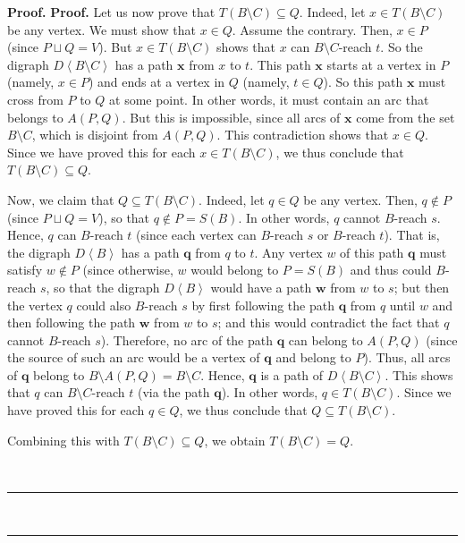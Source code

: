\documentclass[numbers=enddot,12pt,final,onecolumn,notitlepage]{scrartcl}%
\theoremstyle{definition}
\newenvironment{proof}[1][Proof]{\noindent\textbf{#1.} }{\ \rule{0.5em}{0.5em}}
\theoremstyle{plainsl}
\begin{document}
\begin{proof}
\begin{proof}
Let us now prove that $T\left(  B\setminus C\right)  \subseteq Q$. Indeed, let
$x\in T\left(  B\setminus C\right)  $ be any vertex. We must show that $x\in
Q$. Assume the contrary. Then, $x\in P$ (since $P\sqcup Q=V$). But $x\in
T\left(  B\setminus C\right)  $ shows that $x$ can $B\setminus C$-reach $t$.
So the digraph $D\left\langle B\setminus C\right\rangle $ has a path
$\mathbf{x}$ from $x$ to $t$. This path $\mathbf{x}$ starts at a vertex in $P$
(namely, $x\in P$) and ends at a vertex in $Q$ (namely, $t\in Q$). So this
path $\mathbf{x}$ must cross from $P$ to $Q$ at some point. In other words, it
must contain an arc that belongs to $A\left(  P,Q\right)  $. But this is
impossible, since all arcs of $\mathbf{x}$ come from the set $B\setminus C$,
which is disjoint from $A\left(  P,Q\right)  $. This contradiction shows that
$x\in Q$. Since we have proved this for each $x\in T\left(  B\setminus
C\right)  $, we thus conclude that $T\left(  B\setminus C\right)  \subseteq Q$.

Now, we claim that $Q\subseteq T\left(  B\setminus C\right)  $. Indeed, let
$q\in Q$ be any vertex. Then, $q\notin P$ (since $P\sqcup Q=V$), so that
$q\notin P=S\left(  B\right)  $. In other words, $q$ cannot $B$-reach $s$.
Hence, $q$ can $B$-reach $t$ (since each vertex can $B$-reach $s$ or $B$-reach
$t$). That is, the digraph $D\left\langle B\right\rangle $ has a path
$\mathbf{q}$ from $q$ to $t$. Any vertex $w$ of this path $\mathbf{q}$ must
satisfy $w\notin P$ (since otherwise, $w$ would belong to $P=S\left(
B\right)  $ and thus could $B$-reach $s$, so that the digraph $D\left\langle
B\right\rangle $ would have a path $\mathbf{w}$ from $w$ to $s$; but then the
vertex $q$ could also $B$-reach $s$ by first following the path $\mathbf{q}$
from $q$ until $w$ and then following the path $\mathbf{w}$ from $w$ to $s$;
and this would contradict the fact that $q$ cannot $B$-reach $s$). Therefore,
no arc of the path $\mathbf{q}$ can belong to $A\left(  P,Q\right)  $ (since
the source of such an arc would be a vertex of $\mathbf{q}$ and belong to
$P$). Thus, all arcs of $\mathbf{q}$ belong to $B\setminus A\left(
P,Q\right)  =B\setminus C$. Hence, $\mathbf{q}$ is a path of $D\left\langle
B\setminus C\right\rangle $. This shows that $q$ can $B\setminus C$-reach $t$
(via the path $\mathbf{q}$). In other words, $q\in T\left(  B\setminus
C\right)  $. Since we have proved this for each $q\in Q$, we thus conclude
that $Q\subseteq T\left(  B\setminus C\right)  $.

Combining this with $T\left(  B\setminus C\right)  \subseteq Q$, we obtain
$T\left(  B\setminus C\right)  =Q$.


\end{proof}
\end{proof}
\end{document}
